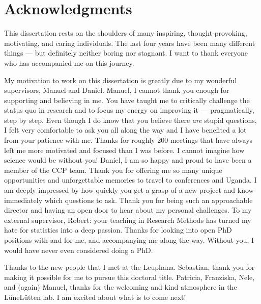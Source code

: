 \documentclass[
]{scrbook}
\begin{document}
\begin{titlepage}
\end{titlepage}

\chapter{Acknowledgments}\label{acknowledgments}

This dissertation rests on the shoulders of many inspiring, thought-provoking, motivating, and caring individuals. The last four years have been many different things --- but definitely neither boring nor stagnant. I want to thank everyone who has accompanied me on this journey.

My motivation to work on this dissertation is greatly due to my wonderful supervisors, Manuel and Daniel. Manuel, I cannot thank you enough for supporting and believing in me. You have taught me to critically challenge the status quo in research and to focus my energy on improving it --- pragmatically, step by step. Even though I do know that you believe there \emph{are} stupid questions, I felt very comfortable to ask you all along the way and I have benefited a lot from your patience with me. Thanks for roughly 200 meetings that have always left me more motivated and focused than I was before. I cannot imagine how science would be without you! Daniel, I am so happy and proud to have been a member of the CCP team. Thank you for offering me so many unique opportunities and unforgettable memories to travel to conferences and Uganda. I am deeply impressed by how quickly you get a grasp of a new project and know immediately which questions to ask. Thank you for being such an approachable director and having an open door to hear about my personal challenges. To my external supervisor, Robert: your teaching in Research Methods has turned my hate for statistics into a deep passion. Thanks for looking into open PhD positions with and for me, and accompanying me along the way. Without you, I would have never even considered doing a PhD.

Thanks to the new people that I met at the Leuphana. Sebastian, thank you for making it possible for me to pursue this doctoral title. Patricia, Franziska, Nele, and (again) Manuel, thanks for the welcoming and kind atmosphere in the LüneLütten lab. I am excited about what is to come next!
\end{document}
